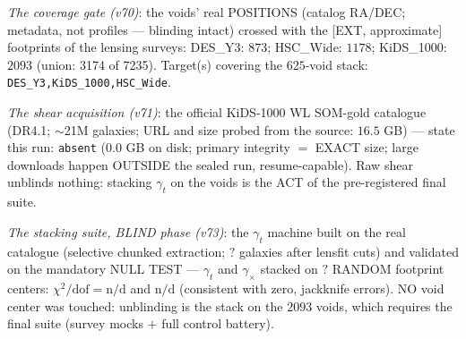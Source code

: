 \documentclass[11pt]{article}
\theoremstyle{definition}\newtheorem{deriv}{Derivation}
\begin{document}
\emph{The coverage gate (v70)}: the voids' real POSITIONS (catalog RA/DEC; metadata, not profiles --- blinding intact) crossed with the [EXT, approximate] footprints of the lensing surveys: DES\_Y3: $873$; HSC\_Wide: $1178$; KiDS\_1000: $2093$ (union: 3174 of 7235). Target(s) covering the $625$-void stack: \texttt{DES\_Y3,KiDS\_1000,HSC\_Wide}.

\emph{The shear acquisition (v71)}: the official KiDS-1000 WL SOM-gold catalogue (DR4.1; $\sim$21M galaxies; URL and size probed from the source: $16.5$ GB) --- state this run: \texttt{absent} ($0.0$ GB on disk; primary integrity $=$ EXACT size; large downloads happen OUTSIDE the sealed run, resume-capable). Raw shear unblinds nothing: stacking $\gamma_t$ on the voids is the ACT of the pre-registered final suite.

\emph{The stacking suite, BLIND phase (v73)}: the $\gamma_t$ machine built on the real catalogue (selective chunked extraction; $?$ galaxies after lensfit cuts) and validated on the mandatory NULL TEST --- $\gamma_t$ and $\gamma_\times$ stacked on $?$ RANDOM footprint centers: $\chi^2/\mathrm{dof}=\text{n/d}$ and $\text{n/d}$ (consistent with zero, jackknife errors). NO void center was touched: unblinding is the stack on the $2093$ voids, which requires the final suite (survey mocks $+$ full control battery).
\end{document}
